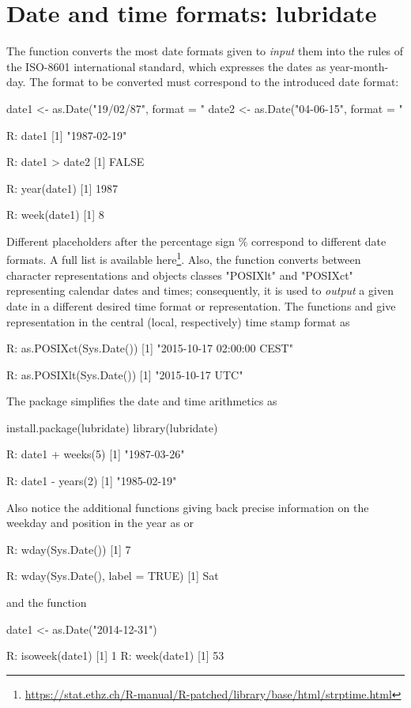 \section{Date and time formats: lubridate}\label{sec: time}
The function  converts the most
date formats given to \emph{input} them 
into the rules of the ISO-8601 
international standard, which expresses the dates
as year-month-day. The format to be converted 
must correspond to the introduced date format:
\begin{example}
date1 <- as.Date("19/02/87", format = "%
date2 <- as.Date("04-06-15", format = "%

R: date1
[1] "1987-02-19"

R: date1 > date2
[1] FALSE

R: year(date1)
[1] 1987

R: week(date1)
[1] 8
\end{example}

Different placeholders after the percentage sign $\%$
correspond to different date formats. A full list is
available here\footnote{
\url{https://stat.ethz.ch/R-manual/R-patched/library/base/html/strptime.html}}.
Also, the function  converts between character 
representations and objects classes "POSIXlt" 
and "POSIXct" representing calendar dates and times;
consequently, it is used to \emph{output} a given date in a 
different desired time format or representation.
\medskip 
The functions  and 
give representation in the central (local, respectively)
time stamp format as
\begin{example}
R: as.POSIXct(Sys.Date())
[1] "2015-10-17 02:00:00 CEST"

R: as.POSIXlt(Sys.Date())
[1] "2015-10-17 UTC" 
\end{example}
\bigskip

The package  simplifies the date and
time arithmetics as
\begin{example}
install.package(lubridate)
library(lubridate)

R: date1  + weeks(5)
[1] "1987-03-26"

R: date1 - years(2)
[1] "1985-02-19"
\end{example}
Also notice the additional functions giving back
precise information on the weekday and position in
the year as  or 
\begin{example}
R: wday(Sys.Date())
[1] 7

R: wday(Sys.Date(), label = TRUE)
[1] Sat 
\end{example}
and the function 
\begin{example}
date1 <- as.Date("2014-12-31")

R: isoweek(date1)
[1] 1
R: week(date1)
[1] 53
\end{example}
